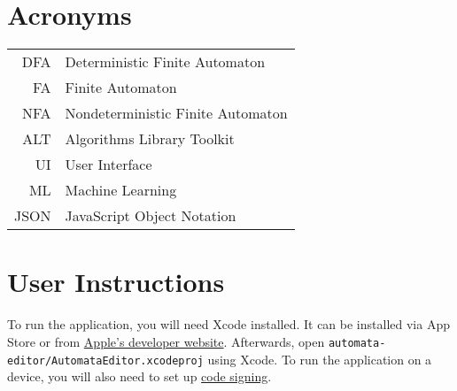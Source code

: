 \chapter{Acronyms}
	
\begin{tabular}{rl}
DFA & Deterministic Finite Automaton\\
FA & Finite Automaton\\
NFA & Nondeterministic Finite Automaton\\
ALT & Algorithms Library Toolkit\\
UI & User Interface\\
ML & Machine Learning\\
JSON & JavaScript Object Notation\\
\end{tabular}

\chapter{User Instructions}

To run the application, you will need Xcode installed. It can be installed via App Store or from \href{https://developer.apple.com/downloads/}{Apple's developer website}. Afterwards, open \lstinline{automata-editor/AutomataEditor.xcodeproj} using Xcode. To run the application on a device, you will also need to set up \href{https://developer.apple.com/support/code-signing/}{code signing}.
